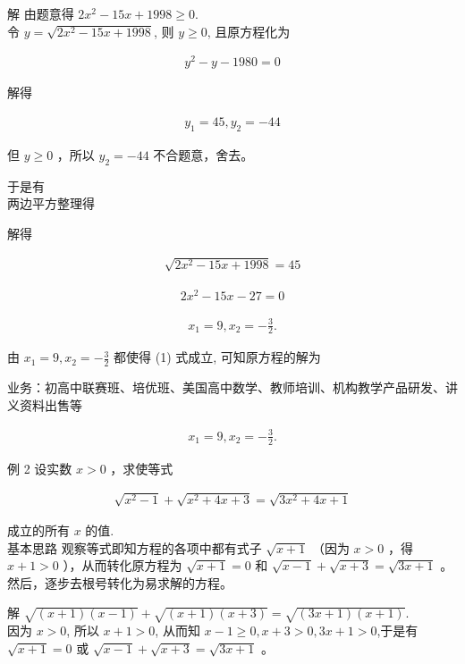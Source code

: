 \documentclass[10pt]{article}
\begin{document}
解 由题意得 $2 x^{2}-15 x+1998 \geqslant 0$.\\
令 $y=\sqrt{2 x^{2}-15 x+1998}$, 则 $y \geqslant 0$, 且原方程化为

\begin{align*}
y^{2}-y-1980=0
\end{align*}

解得

\begin{align*}
y_{1}=45, y_{2}=-44
\end{align*}

但 $y \geqslant 0$ ，所以 $y_{2}=-44$ 不合题意，舍去。

于是有\\
两边平方整理得

解得

\begin{align*}
\sqrt{2 x^{2}-15 x+1998}=45
\end{align*}

\begin{align*}
2 x^{2}-15 x-27=0
\end{align*}

\begin{align*}
x_{1}=9, x_{2}=-\frac{3}{2} .
\end{align*}

由 $x_{1}=9, x_{2}=-\frac{3}{2}$ 都使得 (1) 式成立, 可知原方程的解为

业务：初高中联赛班、培优班、美国高中数学、教师培训、机构教学产品研发、讲义资料出售等

\begin{align*}
x_{1}=9, x_{2}=-\frac{3}{2} .
\end{align*}

例 2 设实数 $x>0$ ，求使等式

\begin{align*}
\sqrt{x^{2}-1}+\sqrt{x^{2}+4 x+3}=\sqrt{3 x^{2}+4 x+1}
\end{align*}

成立的所有 $x$ 的值.\\
基本思路 观察等式即知方程的各项中都有式子 $\sqrt{x+1}$ （因为 $x>0$ ，得 $x+1>0$ ），从而转化原方程为 $\sqrt{x+1}=0$ 和 $\sqrt{x-1}+\sqrt{x+3}=\sqrt{3 x+1}$ 。然后，逐步去根号转化为易求解的方程。

解 $\sqrt{(x+1)(x-1)}+\sqrt{(x+1)(x+3)}=\sqrt{(3 x+1)(x+1)}$.\\
因为 $x>0$, 所以 $x+1>0$, 从而知 $x-1 \geqslant 0, x+3>0,3 x+1>0$,于是有 $\sqrt{x+1}=0$ 或 $\sqrt{x-1}+\sqrt{x+3}=\sqrt{3 x+1}$ 。
\end{document}
